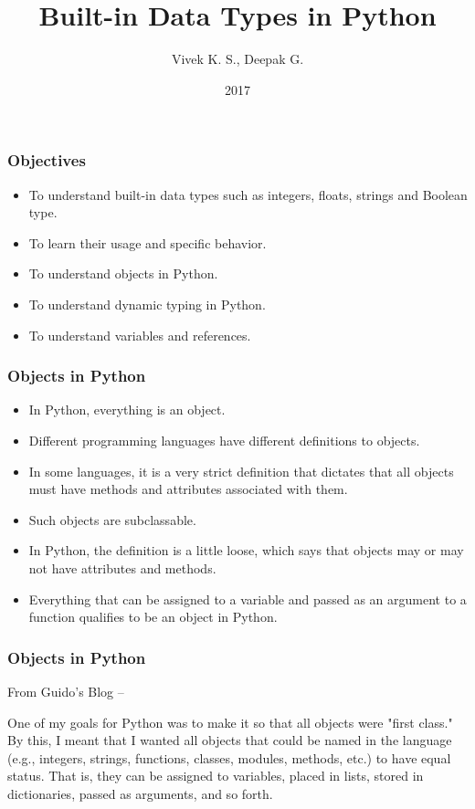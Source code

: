 \documentclass{beamer}
\title{Built-in Data Types in Python}
\author{Vivek K. S., Deepak G.}
\institute{Information Systems Decision Sciences (ISDS)\\
MUMA College of Business\\
University of South Florida \\
Tampa, Florida}
\date{2017}
\begin{document}
 
\frame{\titlepage}
 
\begin{frame}
\frametitle{Objectives}

\begin{itemize}
\item To understand built-in data types such as integers, floats, strings and Boolean type.
\item To learn their usage and specific behavior.
\item To understand objects in Python.
\item To understand dynamic typing in Python.
\item To understand variables and references.
\end{itemize}
\end{frame}

\begin{frame}
\frametitle{Objects in Python}
\begin{itemize}
\item In Python, everything is an object.
\item Different programming languages have different definitions to objects.
\item In some languages, it is a very strict definition that dictates that all objects must have methods and attributes associated with them.
\item Such objects are subclassable.
\item In Python, the definition is a little loose, which says that objects may or may not have attributes and methods.
\item Everything that can be assigned to a variable and passed as an argument to a function qualifies to be an object in Python.
\end{itemize}
\end{frame}

\begin{frame}
\frametitle{Objects in Python}
From Guido's Blog --

One of my goals for Python was to make it so that all objects were "first class." By this, I meant that I wanted all objects that could be named in the language (e.g., integers, strings, functions, classes, modules, methods, etc.) to have equal status. That is, they can be assigned to variables, placed in lists, stored in dictionaries, passed as arguments, and so forth.
\end{frame}
\end{document}
